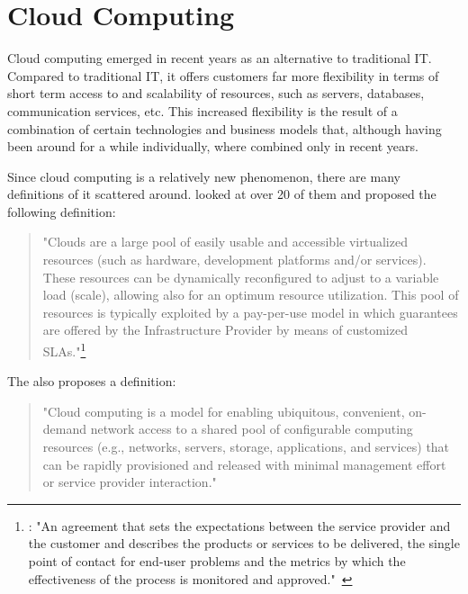 \section{Cloud Computing}
\label{fundamentals:cloud}

Cloud computing emerged in recent years as an alternative to traditional IT.
Compared to traditional IT, it offers customers far more flexibility in terms of short term access to and scalability of resources, such as servers, databases, communication services, etc.
This increased flexibility is the result of a combination of certain technologies and business models that, although having been around for a while individually, where combined only in recent years.

Since cloud computing is a relatively new phenomenon, there are many definitions of it scattered around. \citeauthor{cloud:def:towards} looked at over 20 of them and proposed the following definition:

\begin{quote}
	"Clouds are a large pool of easily usable and accessible virtualized resources (such as hardware, development platforms and/or services). These resources can be dynamically reconfigured to adjust to a variable load (scale), allowing also for an optimum resource utilization. This pool of resources is typically exploited by a pay-per-use model in which guarantees are offered by the Infrastructure Provider by means of customized SLAs."\footnote{: "An agreement that sets the expectations between the service provider and the customer and describes the products or services to be delivered, the single point of contact for end-user problems and the metrics by which the effectiveness of the process is monitored and approved."~\autocite{def:sla}}~\autocite{cloud:def:towards}
\end{quote}

The  also proposes a definition:

\begin{quote}
	"Cloud computing is a model for enabling ubiquitous, convenient, on-demand network access to a shared pool of configurable computing resources (e.g., networks, servers, storage, applications, and services) that can be rapidly provisioned and released with minimal management effort or service provider interaction."~\autocite{cloud:def:nist}
\end{quote}

